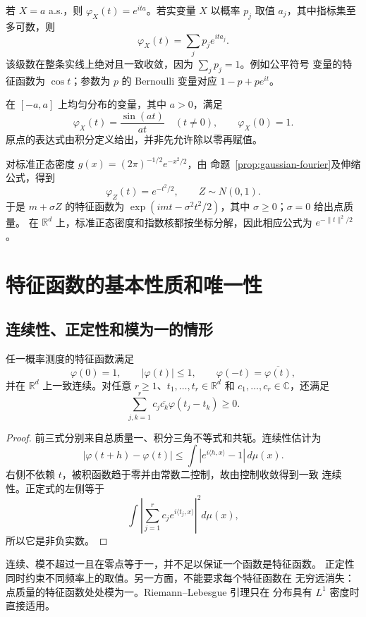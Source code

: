 若 $X=a$ a.s.，则 $\varphi_X(t)=e^{ita}$。若实变量 $X$ 以概率 $p_j$
取值 $a_j$，其中指标集至多可数，则
\[
 \varphi_X(t)=\sum_jp_je^{ita_j}.
\]
该级数在整条实线上绝对且一致收敛，因为 $\sum_jp_j=1$。例如公平符号
变量的特征函数为 $\cos t$；参数为 $p$ 的 Bernoulli 变量对应
$1-p+pe^{it}$。

在 $[-a,a]$ 上均匀分布的变量，其中 $a>0$，满足
\[
 \varphi_X(t)=\frac{\sin(at)}{at}\quad(t\ne0),\qquad \varphi_X(0)=1.
\]
原点的表达式由积分定义给出，并非先允许除以零再赋值。

对标准正态密度
$g(x)=(2\pi)^{-1/2}e^{-x^2/2}$，由
命题~\ref{prop:gaussian-fourier}及伸缩公式，得到
\[
 \varphi_Z(t)=e^{-t^2/2},\qquad Z\sim N(0,1).
\]
于是 $m+\sigma Z$ 的特征函数为
$\exp(imt-\sigma^2t^2/2)$，其中 $\sigma\ge0$；$\sigma=0$ 给出点质量。
在 $\mathbb R^d$ 上，标准正态密度和指数核都按坐标分解，因此相应公式为
$e^{-\|t\|^2/2}$。

\section{特征函数的基本性质和唯一性}
\label{sec:characteristic-uniqueness}

\subsection{连续性、正定性和模为一的情形}

\begin{proposition}
\label{prop:characteristic-basic-properties}
任一概率测度的特征函数满足
\[
 \varphi(0)=1,\qquad |\varphi(t)|\le1,\qquad
 \varphi(-t)=\overline{\varphi(t)},
\]
并在 $\mathbb R^d$ 上一致连续。对任意 $r\ge1$、$t_1,\ldots,t_r\in\mathbb R^d$
和 $c_1,\ldots,c_r\in\mathbb C$，还满足
\[
 \sum_{j,k=1}^r c_j\overline{c_k}\varphi(t_j-t_k)\ge0.
\]
\end{proposition}

\begin{proof}
前三式分别来自总质量一、积分三角不等式和共轭。连续性估计为
\[
 |\varphi(t+h)-\varphi(t)|
 \le\int|e^{i\langle h,x\rangle}-1|\,d\mu(x).
\]
右侧不依赖 $t$，被积函数趋于零并由常数二控制，故由控制收敛得到一致
连续性。正定式的左侧等于
\[
 \int\left|\sum_{j=1}^r c_je^{i\langle t_j,x\rangle}\right|^2d\mu(x),
\]
所以它是非负实数。
\end{proof}

连续、模不超过一且在零点等于一，并不足以保证一个函数是特征函数。
正定性同时约束不同频率上的取值。另一方面，不能要求每个特征函数在
无穷远消失：点质量的特征函数处处模为一。Riemann--Lebesgue 引理只在
分布具有 $L^1$ 密度时直接适用。


